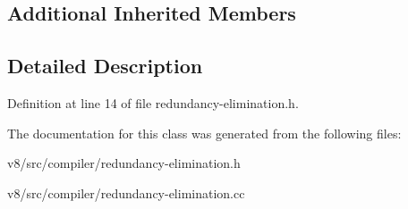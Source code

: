 \subsection*{Additional Inherited Members}


\subsection{Detailed Description}


Definition at line 14 of file redundancy-\/elimination.\+h.



The documentation for this class was generated from the following files\+:\begin{DoxyCompactItemize}
\item 
v8/src/compiler/redundancy-\/elimination.\+h\item 
v8/src/compiler/redundancy-\/elimination.\+cc\end{DoxyCompactItemize}
